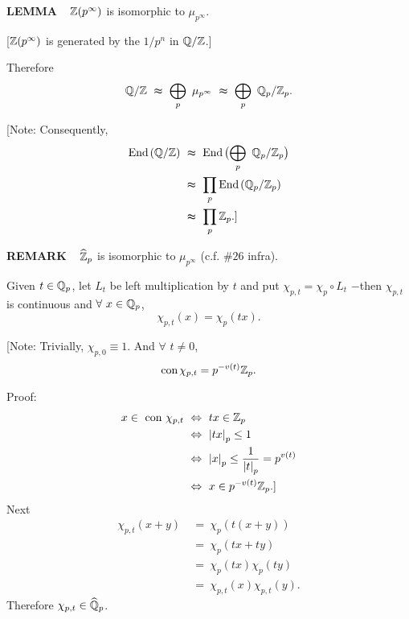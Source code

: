\begin{x}{\small\bf LEMMA} \ %
$\mathbb{Z}(p^\infty)$ is isomorphic to $\mu_{p^\infty}$.

\vspace{0.1cm}

[$\mathbb{Z}(p^\infty)$ is generated by the $1/p^n$ in $\mathbb{Q} /  \mathbb{Z}$.]

\vspace{0.2cm}

Therefore
\[
\Q /  \Z \ \thickapprox \ \bigoplus_p \  \mu_{p^\infty} \ \thickapprox \ \bigoplus_p \  \Q_p /  \Z_p.
\]

[Note: Consequently, 
\begin{align*}
\End(\Q / \Z)	\ 
&\thickapprox \ \End \bigl(\bigoplus\limits_p \ \Q_p /  \Z_p\bigr)\\	
&\thickapprox \ \prod\limits_p \End(\Q_p /  \Z_p)\\	
&\thickapprox \ \prod \limits_p \Z_p.]
\end{align*}
\end{x}

\vspace{0.1cm}


\begin{x}{\small\bf REMARK} \ %
$\widehat{\mathbb{Z}}_p$ is isomorphic to $\mu_{p^\infty}$ (c.f. $\# 26$ infra).
\end{x}

\vspace{0.1cm}


Given $t \in \mathbb{Q}_p$, let $L_t$ be left multiplication by $t$ and put $\chi_{p,t} = \chi_p \circ L_t$ 
$-$then $\chi_{p,t}$ is continuous and $\forall \ x \in \mathbb{Q}_p$,
\[
\chi_{p,t}(x) = \chi_p(tx).
\]

[Note: Trivially, $\chi_{p,0} \equiv 1$.  And $\forall$ $t \ne 0$, 
\[
\text{con}\hspace{0.05cm} \chi_{p,t} = p^{-v(t)}\mathbb{Z}_p.
\]

Proof: \ 
\begin{align*}
x \in \text{ con }\chi_{p,t}\ 	
&\Leftrightarrow\  tx \in  \mathbb{Z}_p\\			
&\Leftrightarrow\  \left\vert tx\right\vert_p \le 1\\
&\Leftrightarrow\  \left\vert x\right\vert_p \le \frac{1}{\left\vert t\right\vert_p} = p^{v(t)}\\
&\Leftrightarrow\  x \in p^{-v(t)} \mathbb{Z}_p.]	
\end{align*}
Next
\begin{align*}
\chi_{p,t}(x+y)	\  
&=\  \chi_p(t(x+y))\\	
&=\  \chi_p(tx+ty)\\	
&=\  \chi_p(tx)\chi_p(ty)\\		
&=\   \chi_{p,t}(x)\chi_{p,t}(y).
\end{align*}
Therefore $\chi_{p,t} \in \widehat{\mathbb{Q}}_p$.

